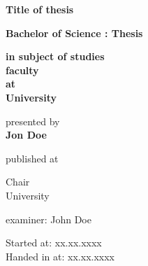 \begin{titlepage}

  \begin{center}
     \LARGE \bf
		  Title of thesis
      
\normalsize \mdseries
    \vspace*{2cm}
    { \large \bf Bachelor of Science : Thesis}

    \begin{center}\bf
    in subject of studies\\
    faculty\\
    at\\
    University
    \end{center}
    \vspace{1cm}

    presented by \\
    \vspace*{0.7cm}
    {\Large \bf Jon Doe} \\
    \vspace*{0.7cm}

    \vspace{5cm}

    published at

    \vspace{0.1cm}

    {
      Chair\\

      University \\
      }

    \vspace{1cm}

    examiner: John Doe\\

    \vspace{1cm}

    Started at: xx.xx.xxxx \\
    Handed in at: xx.xx.xxxx

  \end{center}
\end{titlepage}